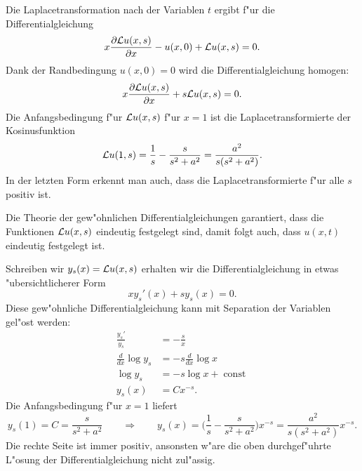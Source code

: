 \begin{loesung}
\begin{teilaufgaben}
\item
Die Laplacetransformation nach der Variablen $t$
ergibt f"ur die Differentialgleichung
\[
x\frac{\partial{\cal L}u(x,s)}{\partial x}
-
u(x,0)+{\cal L}u(x,s)=0.
\]
Dank der Randbedingung $u(x,0)=0$ wird die Differentialgleichung
homogen:
\[
x\frac{\partial{\cal L}u(x,s)}{\partial x}
+
s{\cal L}u(x,s)=0.
\]
Die Anfangsbedingung f"ur ${\cal L}u(x,s)$ f"ur $x=1$ ist die
Laplacetransformierte der Kosinusfunktion
\[
{\cal L}u(1,s)=\frac1s-\frac{s}{s^2+a^2} = \frac{a^2}{s(s^2+a^2)}.
\]
In der letzten Form erkennt man auch, dass die Laplacetransformierte
f"ur alle $s$ positiv ist.
\item
Die Theorie der gew"ohnlichen Differentialgleichungen garantiert, dass
die Funktionen ${\cal L}u(x,s)$ eindeutig festgelegt sind, damit folgt
auch, dass $u(x,t)$ eindeutig festgelegt ist.
\item
Schreiben wir $y_s(x)={\cal L}u(x,s)$ erhalten wir die Differentialgleichung
in etwas "ubersichtlicherer Form
\begin{equation}
xy_s'(x)+sy_s(x)=0.
\label{50000008:sdgl}
\end{equation}
Diese gew"ohnliche Differentialgleichung kann mit Separation der
Variablen gel"ost werden:
\begin{align*}
\frac{y_s'}{y_s}&=-\frac{s}{x}
\\
\frac{d}{dx}\log y_s&=-s\frac{d}{dx}\log x
\\
\log y_s&=-s\log x+\operatorname{const}
\\
y_s(x)&=Cx^{-s}.
\end{align*}
Die Anfangsbedingung f"ur $x=1$ liefert
\begin{equation}
y_s(1)=C=\frac{s}{s^2+a^2}
\qquad\Rightarrow\qquad
y_s(x)
=
\biggl(\frac1s-\frac{s}{s^2+a^2}\biggr)x^{-s}
=
\frac{a^2}{s(s^2+a^2)}x^{-s}.
\label{50000008:loesung}
\end{equation}
Die rechte Seite ist immer positiv, ansonsten w"are die oben durchgef"uhrte
L"osung der Differentialgleichung nicht zul"assig.
\end{teilaufgaben}
\end{loesung}

